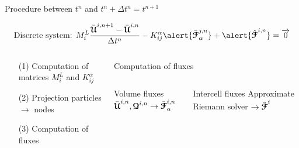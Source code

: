 \begin{frame}{Procedure between $t^n$ and $t^n + \Delta t^n=t^{n+1}$}
  \begin{footnotesize}
    \begin{equation*}
      \text{Discrete system: }M^L_{i} \frac{\bar{\Ucb}^{i,n+1} - \bar{\Ucb}^{i,n}}{\Delta t^n}  - K_{ij}^\alpha \alert{\bar{\Fcb}^{j,n}_{\alpha}}  + \alert{\hat{\Fcb}^{i,n}}=  \vect{0}
    \end{equation*}
    \begin{columns}
      \begin{column}{0.4\textwidth}
        \begin{itemize}
        \item[(1)] Computation of matrices $M_i^L$ and $K_{ij}^\alpha$
        \item[(2)] Projection particles $\rightarrow$ nodes
        \item[(3)] Computation of fluxes
        \item[]
        \item[]
        \item[]
        \item[]
        \item[]
        \end{itemize}
      \end{column}
      \vrule{}
      \begin{column}{0.6\textwidth}
        \begin{block}{Computation of fluxes}
          \begin{columns}
            \begin{column}{0.4\textwidth}
              \begin{block}{\footnotesize Volume fluxes}
                $\bar{{\boldsymbol{\mathcal{U}}}}^{i,n},{\boldsymbol{\mathcal{Q}}}^{i,n} \rightarrow \bar{{\boldsymbol{\mathcal{F}}}}^{i,n}_\alpha$
              \end{block}
            \end{column}
            \begin{column}{0.55\textwidth}
              \begin{block}{\footnotesize Intercell fluxes}
                Approximate Riemann solver $\rightarrow \hat{{\boldsymbol{\mathcal{F}}}}^i$
              \end{block}
            \end{column}
          \end{columns}
        \end{block}
      \end{column}
    \end{columns}
  \end{footnotesize}
\end{frame}

